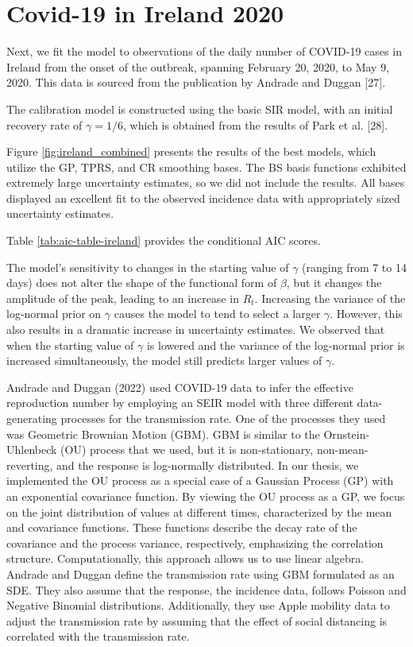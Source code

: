 \documentclass[
11pt, %
oneside, %
english, %
singlespacing, %
]{macthesis} %
\begin{document}
\section{Covid-19 in Ireland 2020}\label{Ireland}

Next, we fit the model to observations of the daily number of COVID-19 cases in Ireland from the onset of the outbreak, spanning February 20, 2020, to May 9, 2020. This data is sourced from the publication by Andrade and Duggan {[}27{]}.

The calibration model is constructed using the basic SIR model, with an initial recovery rate of \(\gamma = 1/6\), which is obtained from the results of Park et al. {[}28{]}.

Figure \ref{fig:ireland_combined} presents the results of the best models, which utilize the GP, TPRS, and CR smoothing bases. The BS basis functions exhibited extremely large uncertainty estimates, so we did not include the results. All bases displayed an excellent fit to the observed incidence data with appropriately sized uncertainty estimates.

Table \ref{tab:aic-table-ireland} provides the conditional AIC scores.

The model's sensitivity to changes in the starting value of \(\gamma\) (ranging from 7 to 14 days) does not alter the shape of the functional form of \(\beta\), but it changes the amplitude of the peak, leading to an increase in \(R_t\). Increasing the variance of the log-normal prior on \(\gamma\) causes the model to tend to select a larger \(\gamma\). However, this also results in a dramatic increase in uncertainty estimates. We observed that when the starting value of \(\gamma\) is lowered and the variance of the log-normal prior is increased simultaneously, the model still predicts larger values of \(\gamma\).

Andrade and Duggan (2022) used COVID-19 data to infer the effective reproduction number by employing an SEIR model with three different data-generating processes for the transmission rate. One of the processes they used was Geometric Brownian Motion (GBM). GBM is similar to the Ornstein-Uhlenbeck (OU) process that we used, but it is non-stationary, non-mean-reverting, and the response is log-normally distributed. In our thesis, we implemented the OU process as a special case of a Gaussian Process (GP) with an exponential covariance function. By viewing the OU process as a GP, we focus on the joint distribution of values at different times, characterized by the mean and covariance functions. These functions describe the decay rate of the covariance and the process variance, respectively, emphasizing the correlation structure. Computationally, this approach allows us to use linear algebra. Andrade and Duggan define the transmission rate using GBM formulated as an SDE. They also assume that the response, the incidence data, follows Poisson and Negative Binomial distributions. Additionally, they use Apple mobility data to adjust the transmission rate by assuming that the effect of social distancing is correlated with the transmission rate.
\end{document}
